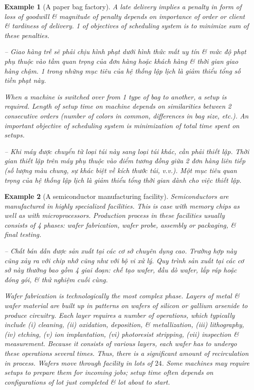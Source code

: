 \documentclass{article}
\newtheorem{example}{Example}
\begin{document}
\begin{itemize}
\begin{itemize}
\begin{example}[A paper bag factory]
            A late delivery implies a penalty in form of loss of goodwill \& magnitude of penalty depends on importance of order or client \& tardiness of delivery. 1 of objectives of scheduling system is to minimize sum of these penalties.
            
            -- Giao hàng trễ sẽ phải chịu hình phạt dưới hình thức mất uy tín \& mức độ phạt phụ thuộc vào tầm quan trọng của đơn hàng hoặc khách hàng \& thời gian giao hàng chậm. 1 trong những mục tiêu của hệ thống lập lịch là giảm thiểu tổng số tiền phạt này.
            
            When a machine is switched over from 1 type of bag to another, a setup is required. Length of setup time on machine depends on similarities between 2 consecutive orders (number of colors in common, differences in bag size, etc.). An important objective of scheduling system is minimization of total time spent on setups.
            
            -- Khi máy được chuyển từ loại túi này sang loại túi khác, cần phải thiết lập. Thời gian thiết lập trên máy phụ thuộc vào điểm tương đồng giữa 2 đơn hàng liên tiếp (số lượng màu chung, sự khác biệt về kích thước túi, v.v.). Một mục tiêu quan trọng của hệ thống lập lịch là giảm thiểu tổng thời gian dành cho việc thiết lập.
        \end{example}
        
        \begin{example}[A semiconductor manufacturing facility]
            Semiconductors are manufactured in highly specialized facilities. This is case with memory chips as well as with microprocessors. Production process in these facilities usually consists of 4 phases: wafer fabrication, wafer probe, assembly or packaging, \& final testing.
            
            -- Chất bán dẫn được sản xuất tại các cơ sở chuyên dụng cao. Trường hợp này cũng xảy ra với chip nhớ cũng như với bộ vi xử lý. Quy trình sản xuất tại các cơ sở này thường bao gồm 4 giai đoạn: chế tạo wafer, đầu dò wafer, lắp ráp hoặc đóng gói, \& thử nghiệm cuối cùng.
            
            Wafer fabrication is technologically the most complex phase. Layers of metal \& wafer material are built up in patterns on wafers of silicon or gallium arsenide to produce circuitry. Each layer requires a number of operations, which typically include (i) cleaning, (ii) oxidation, deposition, \& metallization, (iii) lithography, (iv) etching, (v) ion implantation, (vi) photoresist stripping, (vii) inspection \& measurement. Because it consists of various layers, each wafer has to undergo these operations several times. Thus, there is a significant amount of recirculation in process. Wafers move through facility in lots of $24$. Some machines may require setups to prepare them for incoming jobs; setup time often depends on configurations of lot just completed \& lot about to start.
            

\end{example}
\end{itemize}
\end{itemize}
\end{document}
